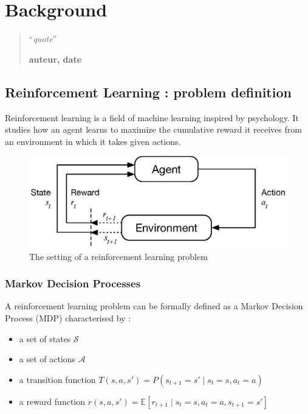 \chapter{Background}
\begin{quotation}
\noindent ``\emph{quote}''
\begin{flushright}\textbf{auteur, date}\end{flushright}
\end{quotation}

\vspace*{0.5cm}

\section{Reinforcement Learning : problem definition}
Reinforcement learning is a field of machine learning inspired by psychology.
It studies how an agent learns to maximize the cumulative reward it receives
from an environment in which it takes given actions. 

\begin{figure}[]
	\centering
	\includegraphics[width=0.65\linewidth]{fig/rl.eps}
	\caption{The setting of a reinforcement learning problem 
		\cite{suttonbarto}}
	\label{fig:rl}
\end{figure}

\subsection{Markov Decision Processes}
A reinforcement learning problem can be formally defined as a Markov 
Decision Process (MDP)  characterised by :
\begin{itemize}
	\item a set of states $\mathcal{S}$
	\item a set of actions $\mathcal{A}$
	\item a transition function 
		$T(s, a, s') = P(s_{t+1} = s' \mid s_t = s, a_t = a)$
	\item a reward function 
		$r(s, a, s') = \mathbb{E}
		 [r_{t+1} \mid s_t = s, a_t = a, s_{t+1} = s']$
\end{itemize}

